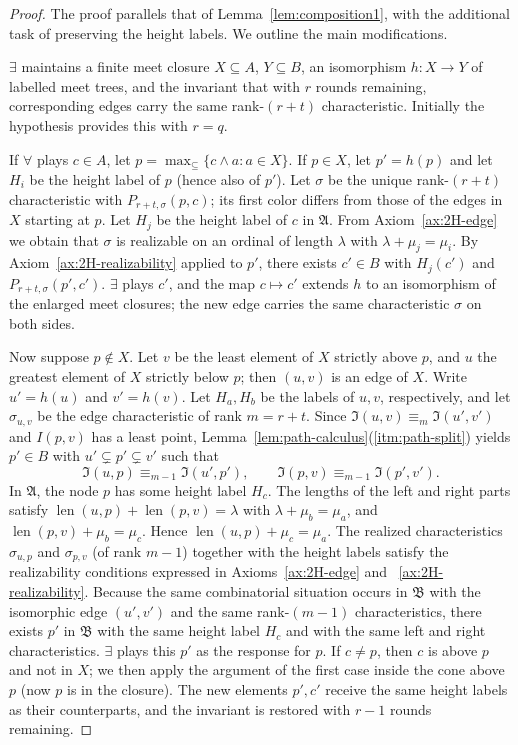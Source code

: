 \documentclass{amsart}
\theoremstyle{definition}
\begin{document}
\begin{proof}
    The proof parallels that of Lemma~\ref{lem:composition1}, with the additional task of preserving the height labels. We outline the main modifications.

    $\exists$ maintains a finite meet closure $X\subseteq A$, $Y\subseteq B$, an isomorphism $h\colon X\to Y$ of labelled meet trees, and the invariant that with $r$ rounds remaining, corresponding edges carry the same rank-$(r+t)$ characteristic. Initially the hypothesis provides this with $r=q$.

    If $\forall$ plays $c\in A$, let $p=\max_{\subseteq}\{c\wedge a : a\in X\}$. If $p\in X$, let $p'=h(p)$ and let $H_i$ be the height label of $p$ (hence also of $p'$). Let $\sigma$ be the unique rank-$(r+t)$ characteristic with $P_{r+t,\sigma}(p,c)$; its first color differs from those of the edges in $X$ starting at $p$. Let $H_j$ be the height label of $c$ in $\mathfrak A$. From Axiom~\ref{ax:2H-edge} we obtain that $\sigma$ is realizable on an ordinal of length $\lambda$ with $\lambda+\mu_j=\mu_i$. By Axiom~\ref{ax:2H-realizability} applied to $p'$, there exists $c'\in B$ with $H_j(c')$ and $P_{r+t,\sigma}(p',c')$. $\exists$ plays $c'$, and the map $c\mapsto c'$ extends $h$ to an isomorphism of the enlarged meet closures; the new edge carries the same characteristic $\sigma$ on both sides.

    Now suppose $p\notin X$. Let $v$ be the least element of $X$ strictly above $p$, and $u$ the greatest element of $X$ strictly below $p$; then $(u,v)$ is an edge of $X$. Write $u'=h(u)$ and $v'=h(v)$. Let $H_a,H_b$ be the labels of $u,v$, respectively, and let $\sigma_{u,v}$ be the edge characteristic of rank $m=r+t$. Since $\mathfrak I(u,v)\equiv_m\mathfrak I(u',v')$ and $I(p,v)$ has a least point, Lemma~\ref{lem:path-calculus}(\ref{itm:path-split}) yields $p'\in B$ with $u'\subsetneq p'\subsetneq v'$ such that
    $$\mathfrak I(u,p)\equiv_{m-1}\mathfrak I(u',p'),\qquad \mathfrak I(p,v)\equiv_{m-1}\mathfrak I(p',v').$$
    In $\mathfrak A$, the node $p$ has some height label $H_c$.  The lengths of the left and right parts satisfy $\operatorname{len}(u,p)+\operatorname{len}(p,v)=\lambda$ with $\lambda+\mu_b=\mu_a$, and $\operatorname{len}(p,v)+\mu_b=\mu_c$.  Hence $\operatorname{len}(u,p)+\mu_c=\mu_a$.  The realized characteristics $\sigma_{u,p}$ and $\sigma_{p,v}$ (of rank $m-1$) together with the height labels satisfy the realizability conditions expressed in Axioms~\ref{ax:2H-edge} and ~\ref{ax:2H-realizability}.  Because the same combinatorial situation occurs in $\mathfrak B$ with the isomorphic edge $(u',v')$ and the same rank-$(m-1)$ characteristics, there exists $p'$ in $\mathfrak B$ with the same height label $H_c$ and with the same left and right characteristics.  $\exists$ plays this $p'$ as the response for $p$.  If $c\neq p$, then $c$ is above $p$ and not in $X$; we then apply the argument of the first case inside the cone above $p$ (now $p$ is in the closure).  The new elements $p',c'$ receive the same height labels as their counterparts, and the invariant is restored with $r-1$ rounds remaining.


\end{proof}
\end{document}
